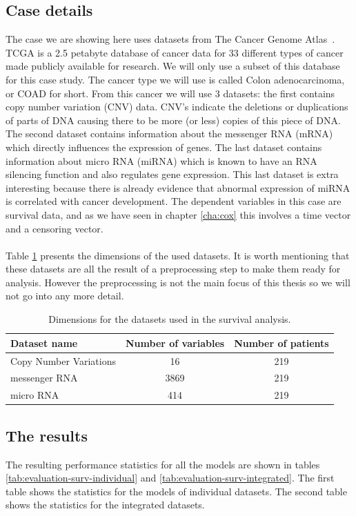 \subsection{Case details}
\label{sec:evaluation-casedetails2}
The case we are showing here uses datasets from The Cancer Genome Atlas~\cite{tcga}. TCGA is a 2.5 petabyte database of cancer data for 33 different types of cancer made publicly available for research. We will only use a subset of this database for this case study. The cancer type we will use is called Colon adenocarcinoma, or COAD for short. From this cancer we will use 3 datasets: the first contains copy number variation (CNV) data. CNV's indicate the deletions or duplications of parts of DNA causing there to be more (or less) copies of this piece of DNA. The second dataset contains information about the messenger RNA (mRNA) which directly influences the expression of genes. The last dataset contains information about micro RNA (miRNA) which is known to have an RNA silencing function and also regulates gene expression. This last dataset is extra interesting because there is already evidence that abnormal expression of miRNA is correlated with cancer development\cite{iorio2005microrna}\cite{yanaihara2006unique}\cite{wikimicrorna}. The dependent variables in this case are survival data, and as we have seen in chapter \ref{cha:cox} this involves a time vector and a censoring vector. \\ \\
Table \ref{tab:evaluation-case2-dimensions} presents the dimensions of the used datasets. It is worth mentioning that these datasets are all the result of a preprocessing step to make them ready for analysis. However the preprocessing is not the main focus of this thesis so we will not go into any more detail.
\begin{table}
	\centering
	\begin{tabular}{lcc}
		\toprule
		Dataset name & Number of variables & Number of patients \\
		\midrule
		Copy Number Variations & 16 & 219\\
		messenger RNA & 3869 & 219 \\
		micro RNA & 414 & 219 \\
		\bottomrule
	\end{tabular}
	\caption{Dimensions for the datasets used in the survival analysis.}
	\label{tab:evaluation-case2-dimensions}
\end{table}
\subsection{The results}
The resulting performance statistics for all the models are shown in tables \ref{tab:evaluation-surv-individual} and \ref{tab:evaluation-surv-integrated}. The first table shows the statistics for the models of individual datasets. The second table shows the statistics for the integrated datasets.
